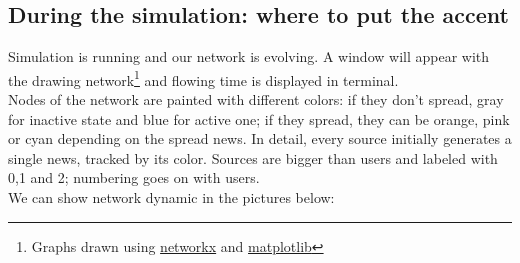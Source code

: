 \subsection{During the simulation: where to put the accent}\label{subsec:during}
Simulation is running and our network is evolving. A window will appear
with the drawing network\footnote{Graphs drawn using
  \href{https://networkx.github.io/}{networkx} and
  \href{https://matplotlib.org/}{matplotlib}}
and flowing time is displayed in terminal. \\
Nodes of the network are painted with different colors: if they don't
spread, gray for inactive state and blue for active one; if they spread,
they can be orange, pink or cyan depending on the spread news.
In detail, every source initially generates a single news, tracked by its color. Sources are bigger than users and labeled with 0,1 and 2; numbering goes on with users.\\
We can show network dynamic in the pictures below:
